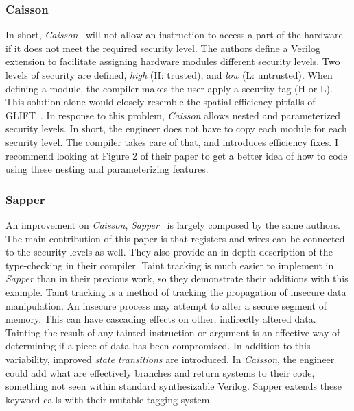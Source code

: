 \documentclass[sigconf,usenames,dvipsnames,svgnames,table]{acmart}
\begin{document}
      \subsubsection{Caisson}\label{sec:prior:csbl:c}
        In short, \textit{Caisson}~\cite{2011caisson} will not allow an instruction to access a part of the hardware if it does not meet the required security level.
        The authors define a Verilog extension to facilitate assigning hardware modules different security levels.
        Two levels of security are defined, \textit{high} (H: trusted), and \textit{low} (L: untrusted).
        When defining a module, the compiler makes the user apply a security tag (H or L).
        This solution alone would closely resemble the spatial efficiency pitfalls of GLIFT~\cite{2009glift}.
        In response to this problem, \textit{Caisson} allows nested and parameterized security levels.
        In short, the engineer does not have to copy each module for each security level.  The compiler takes care of that, and introduces efficiency fixes.
        I recommend looking at Figure 2 of their paper to get a better idea of how to code using these nesting and parameterizing features.

      \subsubsection{Sapper}\label{sec:prior:csbl:s}
        An improvement on \textit{Caisson}, \textit{Sapper}~\cite{2014sapper} is largely composed by the same authors.
        The main contribution of this paper is that registers and wires can be connected to the security levels as well.
        They also provide an in-depth description of the type-checking in their compiler.
        Taint tracking is much easier to implement in \textit{Sapper} than in their previous work, so they demonstrate their additions with this example.
        Taint tracking is a method of tracking the propagation of insecure data manipulation.
        An insecure process may attempt to alter a secure segment of memory.
        This can have cascading effects on other, indirectly altered data.
        Tainting the result of any tainted instruction or argument is an effective way of determining if a piece of data has been compromised.
        In addition to this variability, improved \textit{state transitions} are introduced.
        In \textit{Caisson}, the engineer could add what are effectively branches and return systems to their code, something not seen within standard synthesizable Verilog.
        Sapper extends these keyword calls with their mutable tagging system. 
\end{document}

